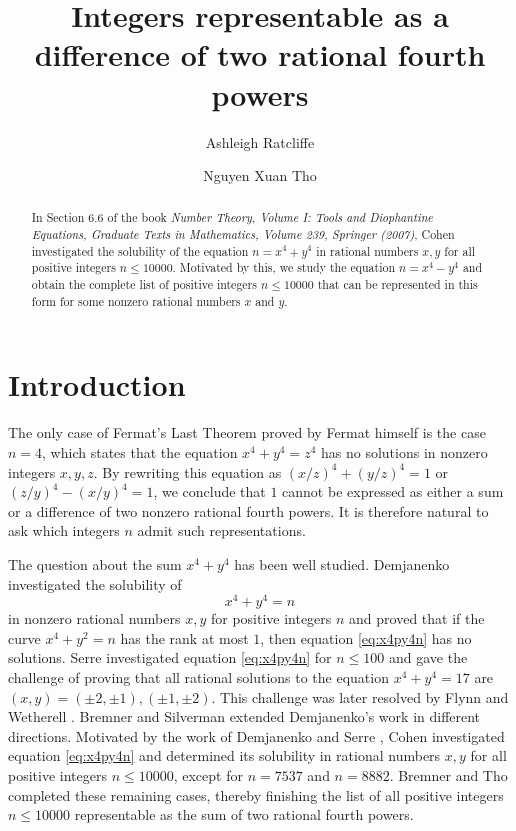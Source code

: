 \documentclass[a4paper,12pt,english,reqno]{amsart}
\title{Integers representable as a difference of two rational fourth powers}
\author[1]{Ashleigh Ratcliffe}
\author[2]{Nguyen Xuan Tho}
\begin{document}
\begin{abstract}  In Section 6.6 of the book {\it Number Theory, Volume I: Tools and Diophantine Equations,  Graduate Texts in Mathematics, Volume 239, Springer (2007)}, Cohen investigated the solubility of the equation $n=x^4+y^4$ in rational numbers $x,y$ for all positive integers $n \leq 10000$. Motivated by this, we study the equation $n=x^4-y^4$ and obtain the complete list of positive integers $n\leq 10000$ that can be represented in this form for some nonzero rational numbers $x$ and $y$. 
\end{abstract}
\maketitle
\section{Introduction} 
The only case of Fermat's Last Theorem proved by Fermat himself  is the case $n=4$, which states that the equation $x^4+y^4=z^4$ has no solutions in nonzero integers $x,y,z$. By rewriting this equation as $(x/z)^4+(y/z)^4=1$ or $(z/y)^4-(x/y)^4=1$, we conclude that $1$ cannot be expressed as either a sum or a difference of two nonzero rational fourth powers. It is therefore natural to ask which integers $n$ admit such representations.

The question about the sum $x^4+y^4$ has been well studied. Demjanenko \cite{MR0228426} investigated the solubility of 
\begin{equation}\label{eq:x4py4n}
x^4+y^4=n
\end{equation}
in nonzero rational numbers $x,y$ for positive integers $n$ and proved that if the curve $x^4+y^2=n$ has the rank at most $1$, then equation \eqref{eq:x4py4n} has no solutions. Serre \cite{Serre} investigated equation \eqref{eq:x4py4n} for $n\leq 100$ and gave the challenge of proving that all rational solutions to the equation $x^4+y^4=17$ are $(x,y)=(\pm 2,\pm 1),(\pm 1,\pm 2)$. This challenge was later resolved by Flynn and Wetherell \cite{Flynn}. Bremner \cite{Bremner1}  and  Silverman \cite{Silverman1} extended Demjanenko's work in different directions. Motivated by the work of Demjanenko \cite{MR0228426} and Serre \cite{Serre}, Cohen \cite[Section 6.6]{MR2312337} investigated equation \eqref{eq:x4py4n} and determined its solubility in rational numbers $x,y$ for all positive integers $n\leq 10000$, except for $n=7537$ and $n=8882$. Bremner and Tho \cite{MR4458887} completed these remaining cases, thereby finishing the list of all positive integers $n\leq 10000$ representable as the sum of two rational fourth powers.
\end{document}
